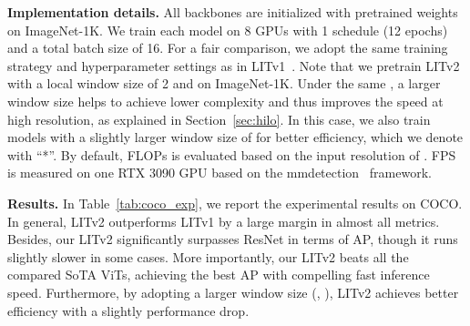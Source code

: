 \textbf{Implementation details.}
All backbones are initialized with pretrained weights on ImageNet-1K. We train each model on 8 GPUs with 1 schedule (12 epochs) and a total batch size of 16. For a fair comparison, we adopt the same training strategy and hyperparameter settings as in LITv1~\cite{lit}. Note that we pretrain LITv2 with a local window size of 2 and  on ImageNet-1K. Under the same , a larger window size helps to achieve lower complexity and thus improves the speed at high resolution, as explained in Section~\ref{sec:hilo}. In this case, we also train models with a slightly larger window size of  for better efficiency, which we denote with ``*''. By default, FLOPs is evaluated based on the input resolution of . FPS is measured on one RTX 3090 GPU based on the mmdetection~\cite{mmdetection} framework.

\textbf{Results.}
In Table~\ref{tab:coco_exp}, we report the experimental results on COCO. In general, LITv2 outperforms LITv1 by a large margin in almost all metrics. Besides, our LITv2 significantly surpasses ResNet in terms of AP, though it runs slightly slower in some cases. More importantly, 
our LITv2 beats all the compared SoTA ViTs, achieving the best AP with compelling fast inference speed.
Furthermore, by adopting a larger window size (\ie, ), LITv2 achieves better efficiency with a slightly performance drop.


